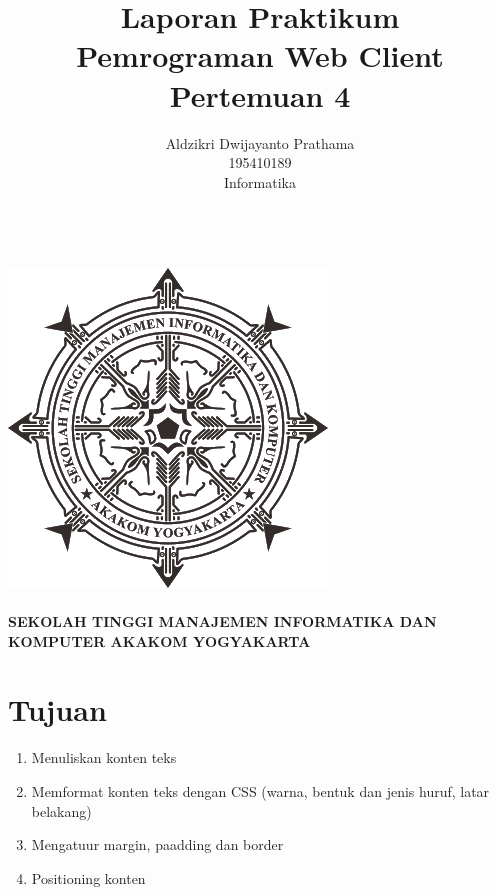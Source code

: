 \documentclass[a4paper,12pt]{article}
\begin{document}
\title{ {\Large Laporan Praktikum}\\ Pemrograman Web Client\\{\Large Pertemuan 4}}

\author{Aldzikri Dwijayanto Prathama 
	\\195410189
	\\Informatika}
\makeatletter
\begin{titlepage}
	\begin{center}
		{\huge \bfseries \@title }\\[14ex]
		\includegraphics[scale=.8]{logo}\\[4ex]
		{\large \@author}\\[12ex]
		{\large \bfseries {SEKOLAH TINGGI MANAJEMEN INFORMATIKA DAN KOMPUTER
				AKAKOM YOGYAKARTA}}
	\end{center}


\end{titlepage}
\makeatother
\newpage
\tableofcontents
\newpage
\section{Tujuan}
\begin{enumerate}
    \item Menuliskan konten teks
    \item Memformat konten teks dengan CSS (warna, bentuk dan jenis huruf, latar belakang)
    \item Mengatuur margin, paadding dan border
    \item Positioning konten
\end{enumerate}
\end{document}
